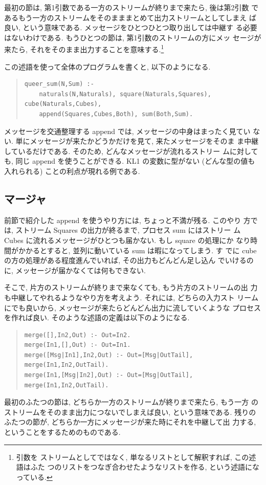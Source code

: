 \documentclass[a4,titlepage]{jsreport}
\newenvironment{program}{\begin{quote}}{\end{quote}}
\begin{document}
最初の節は, 第1引数である一方のストリームが終りまで来たら, 後は第2引数
であるもう一方のストリームをそのまままとめて出力ストリームとしてしまえ
ば良い, という意味である.  メッセージをひとつひとつ取り出しては中継す
る必要はないわけである.  もうひとつの節は, 第1引数のストリームの方にメッ
セージが来たら, それをそのまま出力することを意味する.\footnote {引数を
ストリームとしてではなく, 単なるリストとして解釈すれば, この述語はふた
つのリストをつなぎ合わせたようなリストを作る, という述語になっている.}

この述語を使って全体のプログラムを書くと, 以下のようになる.
\begin{program}
\begin{Verbatim}[baselinestretch=0.8]
queer_sum(N,Sum) :-
    naturals(N,Naturals), square(Naturals,Squares), cube(Naturals,Cubes),
    append(Squares,Cubes,Both), sum(Both,Sum).
\end{Verbatim}
\end{program}

メッセージを交通整理する append では, メッセージの中身はまったく見てい
ない.  単にメッセージが来たかどうかだけを見て, 来たメッセージをそのま
ま中継しているだけである.  そのため, どんなメッセージが流れるストリー
ムに対しても, 同じ append を使うことができる.  KL1 の変数に型がない 
(どんな型の値も入れられる) ことの利点が現れる例である.

\subsection{マージャ}
前節で紹介した append を使うやり方には, ちょっと不満が残る.  このやり
方では, ストリーム Squares の出力が終るまで, プロセス sum にはストリー
ム Cubes に流れるメッセージがひとつも届かない.  もし square の処理にか
なり時間がかかるとすると, 並列に動いている sum は暇になってしまう.  す
でに cube の方の処理がある程度進んでいれば, その出力もどんどん足し込ん
でいけるのに, メッセージが届かなくては何もできない.

そこで, 片方のストリームが終りまで来なくても, もう片方のストリームの出
力も中継してやれるようなやり方を考えよう.  それには, どちらの入力スト
リームにでも良いから, メッセージが来たらどんどん出力に流していくような
プロセスを作れば良い. そのような述語の定義は以下のようになる.
\begin{program}
\begin{Verbatim}[baselinestretch=0.8]
merge([],In2,Out) :- Out=In2.
merge(In1,[],Out) :- Out=In1.
merge([Msg|In1],In2,Out) :- Out=[Msg|OutTail], merge(In1,In2,OutTail).
merge(In1,[Msg|In2],Out) :- Out=[Msg|OutTail], merge(In1,In2,OutTail).
\end{Verbatim}
\end{program}
最初のふたつの節は, どちらか一方のストリームが終りまで来たら, もう一方
のストリームをそのまま出力につないでしまえば良い, という意味である. 
残りのふたつの節が, どちらか一方にメッセージが来た時にそれを中継して出
力する, ということをするためのものである.
\end{document}
